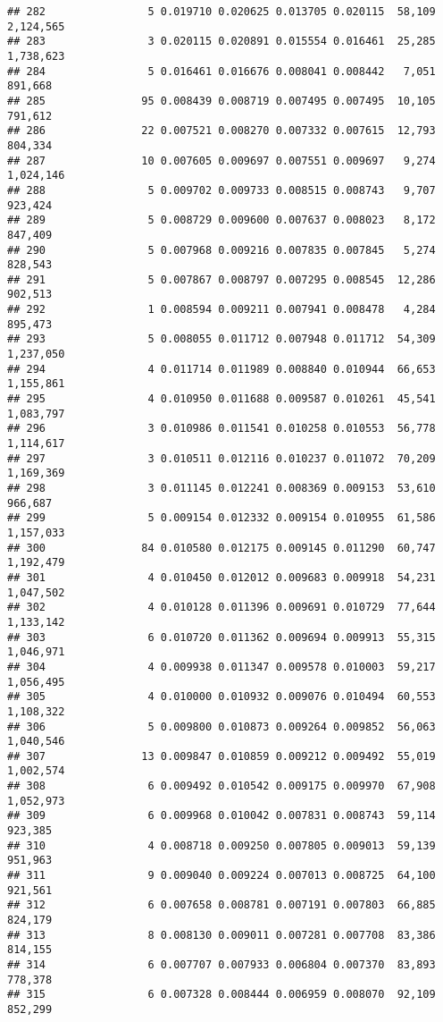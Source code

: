 \documentclass[]{article}
\begin{document}
\begin{verbatim}
## 282                5 0.019710 0.020625 0.013705 0.020115  58,109 2,124,565
## 283                3 0.020115 0.020891 0.015554 0.016461  25,285 1,738,623
## 284                5 0.016461 0.016676 0.008041 0.008442   7,051   891,668
## 285               95 0.008439 0.008719 0.007495 0.007495  10,105   791,612
## 286               22 0.007521 0.008270 0.007332 0.007615  12,793   804,334
## 287               10 0.007605 0.009697 0.007551 0.009697   9,274 1,024,146
## 288                5 0.009702 0.009733 0.008515 0.008743   9,707   923,424
## 289                5 0.008729 0.009600 0.007637 0.008023   8,172   847,409
## 290                5 0.007968 0.009216 0.007835 0.007845   5,274   828,543
## 291                5 0.007867 0.008797 0.007295 0.008545  12,286   902,513
## 292                1 0.008594 0.009211 0.007941 0.008478   4,284   895,473
## 293                5 0.008055 0.011712 0.007948 0.011712  54,309 1,237,050
## 294                4 0.011714 0.011989 0.008840 0.010944  66,653 1,155,861
## 295                4 0.010950 0.011688 0.009587 0.010261  45,541 1,083,797
## 296                3 0.010986 0.011541 0.010258 0.010553  56,778 1,114,617
## 297                3 0.010511 0.012116 0.010237 0.011072  70,209 1,169,369
## 298                3 0.011145 0.012241 0.008369 0.009153  53,610   966,687
## 299                5 0.009154 0.012332 0.009154 0.010955  61,586 1,157,033
## 300               84 0.010580 0.012175 0.009145 0.011290  60,747 1,192,479
## 301                4 0.010450 0.012012 0.009683 0.009918  54,231 1,047,502
## 302                4 0.010128 0.011396 0.009691 0.010729  77,644 1,133,142
## 303                6 0.010720 0.011362 0.009694 0.009913  55,315 1,046,971
## 304                4 0.009938 0.011347 0.009578 0.010003  59,217 1,056,495
## 305                4 0.010000 0.010932 0.009076 0.010494  60,553 1,108,322
## 306                5 0.009800 0.010873 0.009264 0.009852  56,063 1,040,546
## 307               13 0.009847 0.010859 0.009212 0.009492  55,019 1,002,574
## 308                6 0.009492 0.010542 0.009175 0.009970  67,908 1,052,973
## 309                6 0.009968 0.010042 0.007831 0.008743  59,114   923,385
## 310                4 0.008718 0.009250 0.007805 0.009013  59,139   951,963
## 311                9 0.009040 0.009224 0.007013 0.008725  64,100   921,561
## 312                6 0.007658 0.008781 0.007191 0.007803  66,885   824,179
## 313                8 0.008130 0.009011 0.007281 0.007708  83,386   814,155
## 314                6 0.007707 0.007933 0.006804 0.007370  83,893   778,378
## 315                6 0.007328 0.008444 0.006959 0.008070  92,109   852,299

\end{verbatim}
\end{document}
